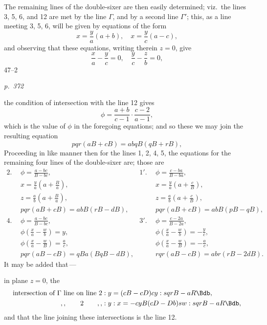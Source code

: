 \documentclass[11pt,a4paper]{article}
\theoremstyle{plain}
\theoremstyle{definition}
\begin{document}
The remaining lines of the double-sixer are then easily determined; viz.\ the lines
3, 5, 6, and 12 are met by the line $\Gamma$, and by a second line $\Gamma'$; this, as a line
meeting 3, 5, 6, will be given by equations of the form
\[
x = \frac{y}{a} (a + b), \quad x = \frac{y}{c} (a - c),
\]
and observing that these equations, writing therein $z = 0$, give
\[
\frac{x}{a} - \frac{y}{c} = 0, \quad \frac{y}{c} - \frac{z}{b} = 0,
\]
\hfill 47--2

\clearpage

\bigskip
\textit{p.~372}
\smallskip

\noindent
the condition of intersection with the line 12 gives
\[
\phi = \frac{a + b}{c - 1}\cdot \frac{c - 2}{a - 1},
\]
which is the value of $\phi$ in the foregoing equations; and so these we may join the
resulting equation
\[
pqr(aB + cB) = abqB(qB + rB),
\]
Proceeding in like manner then for the lines 1, 2, 4, 5, the equations for the remaining
four lines of the double-sixer are; those are
\begin{align*}
2.\ \ & \phi = \frac{a - bc}{B - bc}, & 1'.\ \ & \phi = \frac{c - ba}{B - ba}, \\
&x = \frac{y}{a}(a + \tfrac{B}{a}), & & x = \frac{y}{a}(a + \tfrac{c}{B}), \\
&z = \frac{a}{b}(a + \tfrac{B}{a}), & & z = \frac{a}{b}(a + \tfrac{c}{B}), \\
&pqr(aB + cB) = abB(rB - dB), & & pqr(aB + cB) = abB(pB - qB), \\
4.\ \ & \phi = \frac{a - bc}{B - bc}, & 3'.\ \ & \phi = \frac{c - 2a}{B - 2a}, \\
&\phi\left(\frac{x}{a} - \frac{w}{b}\right) = y, & & \phi\left(\frac{x}{a} - \frac{w}{b}\right) = -\frac{y}{c}, \\
&\phi\left(\frac{x}{a} - \frac{w}{B}\right) = \tfrac{a}{c}, & & \phi\left(\frac{x}{a} - \frac{w}{B}\right) = -\frac{a}{c}, \\
&pqr(aB - cB) = qBa(BqB - dB), & & rqr(aB - cB) = abr(rB - 2 dB).
\end{align*}
It may be added that\,---

in plane $z = 0$, the
\begin{align*}
\text{intersection of } \Gamma \text{ line on line } 2 &: y = (cB - cD) cy : sqrB - aR\Bdb, \\
,, \qquad 2 \qquad ,, &: y : x = -cyB(cD - Db) sw : sqrB - aR\Bdb,
\end{align*}
and that the line joining these intersections is the line 12.
\end{document}
